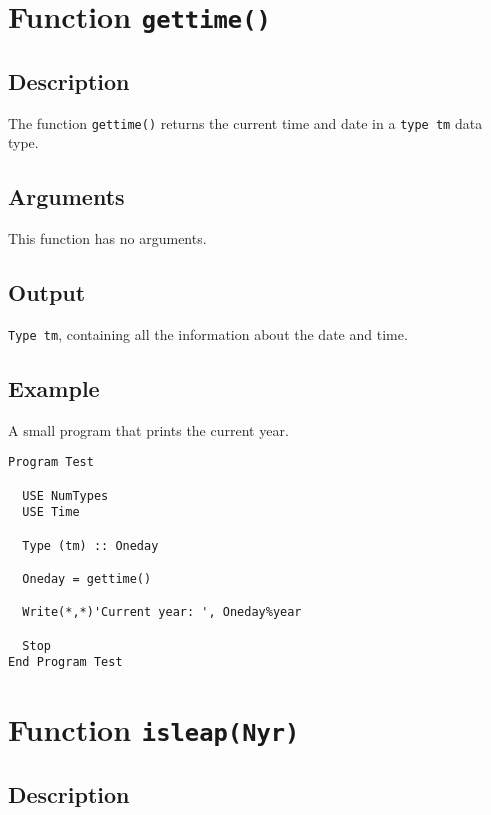 \section{Function \texttt{gettime()}}

\subsection{Description}

The function \texttt{gettime()} returns the current time and date in a
\texttt{type tm} data type.

\subsection{Arguments}

This function has no arguments. 

\subsection{Output}

\texttt{Type tm}, containing all the information about the date and
time. 

\subsection{Example}

A small program that prints the current year.

\begin{verbatim}
Program Test

  USE NumTypes
  USE Time

  Type (tm) :: Oneday

  Oneday = gettime()

  Write(*,*)'Current year: ', Oneday%year

  Stop
End Program Test
\end{verbatim}

\section{Function \texttt{isleap(Nyr)}}

\subsection{Description}

